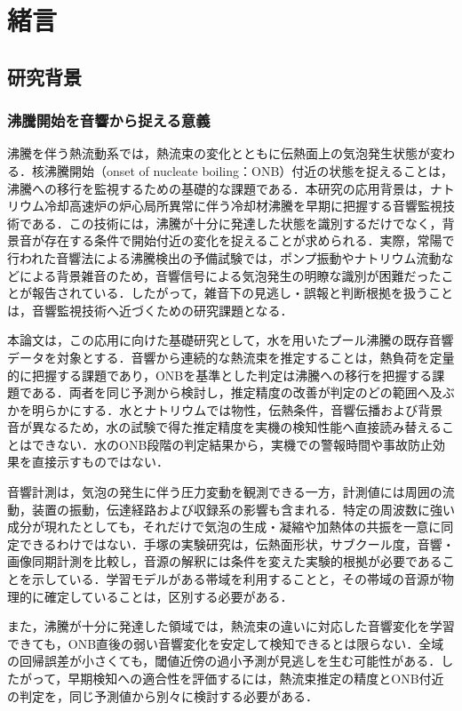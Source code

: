 \chapter{緒言}\label{ch:introduction}
\section{研究背景}
\subsection{沸騰開始を音響から捉える意義}
沸騰を伴う熱流動系では，熱流束の変化とともに伝熱面上の気泡発生状態が変わる．核沸騰開始（onset of nucleate boiling：ONB）付近の状態を捉えることは，沸騰への移行を監視するための基礎的な課題である．本研究の応用背景は，ナトリウム冷却高速炉の炉心局所異常に伴う冷却材沸騰を早期に把握する音響監視技術である．この技術には，沸騰が十分に発達した状態を識別するだけでなく，背景音が存在する条件で開始付近の変化を捉えることが求められる．実際，常陽で行われた音響法による沸騰検出の予備試験では，ポンプ振動やナトリウム流動などによる背景雑音のため，音響信号による気泡発生の明瞭な識別が困難だったことが報告されている\cite{pnc1991}．したがって，雑音下の見逃し・誤報と判断根拠を扱うことは，音響監視技術へ近づくための研究課題となる．

本論文は，この応用に向けた基礎研究として，水を用いたプール沸騰の既存音響データを対象とする．音響から連続的な熱流束を推定することは，熱負荷を定量的に把握する課題であり，ONBを基準とした判定は沸騰への移行を把握する課題である．両者を同じ予測から検討し，推定精度の改善が判定のどの範囲へ及ぶかを明らかにする．水とナトリウムでは物性，伝熱条件，音響伝播および背景音が異なるため，水の試験で得た推定精度を実機の検知性能へ直接読み替えることはできない．水のONB段階の判定結果から，実機での警報時間や事故防止効果を直接示すものではない．

音響計測は，気泡の発生に伴う圧力変動を観測できる一方，計測値には周囲の流動，装置の振動，伝達経路および収録系の影響も含まれる．特定の周波数に強い成分が現れたとしても，それだけで気泡の生成・凝縮や加熱体の共振を一意に同定できるわけではない．手塚の実験研究\cite{tezuka2026}は，伝熱面形状，サブクール度，音響・画像同期計測を比較し，音源の解釈には条件を変えた実験的根拠が必要であることを示している．学習モデルがある帯域を利用することと，その帯域の音源が物理的に確定していることは，区別する必要がある．

また，沸騰が十分に発達した領域では，熱流束の違いに対応した音響変化を学習できても，ONB直後の弱い音響変化を安定して検知できるとは限らない．全域の回帰誤差が小さくても，閾値近傍の過小予測が見逃しを生む可能性がある．したがって，早期検知への適合性を評価するには，熱流束推定の精度とONB付近の判定を，同じ予測値から別々に検討する必要がある．

